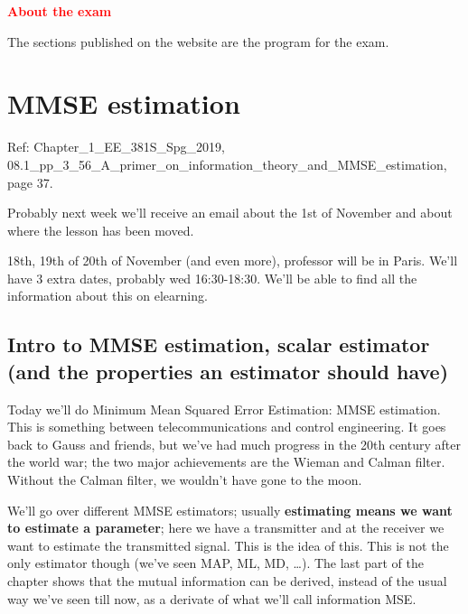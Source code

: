\documentclass[a4paper, 12pt]{book}
\begin{document}
\begin{tcolorbox}[colframe=red!80!white, colback=white, boxrule=1pt, arc=2pt]
    \textcolor{red}{\textbf{About the exam}}

    The sections published on the website are the program for the exam.
\end{tcolorbox}

\section{MMSE estimation}

\noindent
\textcolor{green!60!black}{Ref: \hfill Chapter\_1\_EE\_381S\_Spg\_2019,}\\
\textcolor{green!60!black}{08.1\_pp\_3\_56\_A\_primer\_on\_information\_theory\_and\_MMSE\_estimation, page 37.}

\begin{tcolorbox}[sharp corners, boxrule=0pt, leftrule=2pt, colframe=green!60!black, colback=green!5, left=5pt, top=3pt, bottom=3pt]
    Probably next week we'll receive an email about the 1st of November and about where the lesson has been moved.
    
    18th, 19th of 20th of November (and even more), professor will be in Paris. We'll have 3 extra dates, probably wed 16:30-18:30. We'll be able to find all the information about this on elearning.
\end{tcolorbox}

\subsection{Intro to MMSE estimation, scalar estimator (and the properties an estimator should have)}

Today we'll do Minimum Mean Squared Error Estimation: MMSE estimation.
This is something between telecommunications and control engineering.
It goes back to Gauss and friends, but we've had much progress in the 20th century after the world war; the two major achievements are the Wieman and Calman filter.
Without the Calman filter, we wouldn't have gone to the moon.

We'll go over different MMSE estimators; usually \textbf{estimating means we want to estimate a parameter}; here we have a transmitter and at the receiver we want to estimate the transmitted signal. This is the idea of this.
This is not the only estimator though (we've seen MAP, ML, MD, \ldots).
The last part of the chapter shows that the mutual information can be derived, instead of the usual way we've seen till now, as a derivate of what we'll call information MSE.
\end{document}

